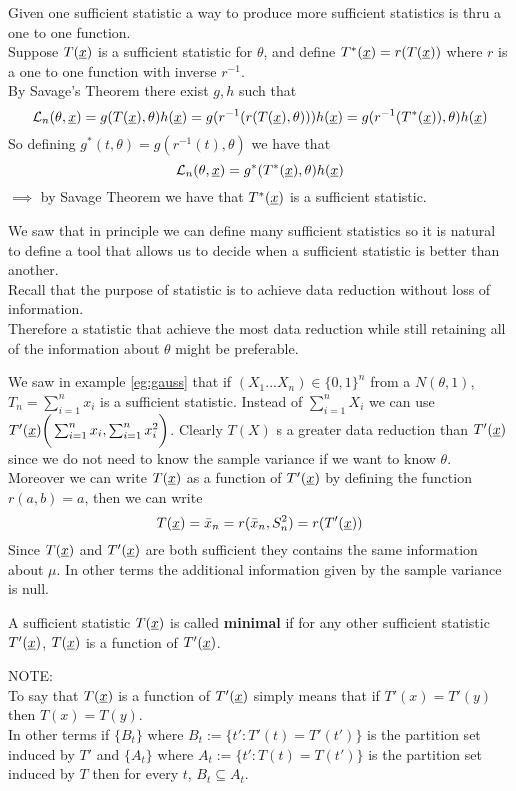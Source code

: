 \begin{oss}
 Given one sufficient statistic a way to produce more sufficient statistics is thru a one to one function.\\
Suppose $T(\underline x)$ is a sufficient statistic for $\theta$, and define $T^*(\underline x)=r(T(\underline x))$ where $r$ is a one to one function with inverse $r^{-1}$.\\
By Savage's Theorem there exist $g,h$ such that
$$\mathcal{L}_n(\theta,\underline x)=g(T(\underline x),\theta)h(\underline x)=g(r^{-1}(r(T(\underline x),\theta)))h(\underline x)=g(r^{-1}(T^*(\underline x)),\theta)h(\underline x)$$
So defining $g^*(t,\theta)=g(r^{-1}(t),\theta)$ we have that
$$\mathcal{L}_n(\theta,\underline x)=g^*(T^*(\underline x),\theta)h(\underline x)$$
$\implies$ by Savage Theorem we have that $T^*(\underline x)$ is a sufficient statistic.
\end{oss}
We saw that in principle we can define many sufficient statistics so it is natural to define a tool that allows us to decide when a sufficient statistic is better than another.\\
Recall that the purpose of statistic is to achieve data reduction without loss of information.\\
Therefore a statistic that achieve the most data reduction while still retaining all of the information about $\theta$ might be preferable.
\begin{oss}
	We saw in example \ref{eg:gauss} that if 	$(X_1... X_n)\in \{0,1\}^n$ from a $N(\theta,1)$,  $T_n=\sum_{i=1}^{n} x_i$ is a sufficient statistic. Instead of $\sum_{i=1}^{n} X_i$ we can use $T'(\underline x)\bigg( \sum_{i=1}^{n} x_i, \sum_{i=1}^{n} x_i^2 \bigg)$. Clearly $T(X)$ s a greater data reduction than $T'(\underline x)$ since we do not need to know the sample variance if we want to know $\theta$. Moreover we can write $T(\underline x)$ as a function of $T'(\underline x)$ by defining the function $r(a,b)=a$, then we can write
	$$T(\underline x)=\bar x_n=r(\bar x_n, S^2_n)=r(T'(\underline x))$$
	Since $T(\underline x)$ and $T'(\underline x)$ are both sufficient they contains the same information about $\mu$.
	In other terms the additional information given by the sample variance is null.
\end{oss} 
\begin{defi}
	A sufficient statistic $T(\underline x)$ is called \textbf{minimal} if for any other sufficient statistic $T'(\underline x)$, $T(\underline x)$ is a function of $T'(\underline x)$. 
\end{defi}
NOTE:\\
To say that $T(\underline x)$  is a function of  $T'(\underline x)$ simply means that if $T'(x)=T'(y)$ then $T(x)=T(y)$.\\
In other terms if $\{ B_t\} $ where $B_t:=\{t' : T'(t)=T'(t') \}$ is the partition set induced by $T'$ and $\{ A_t\} $ where $A_t:=\{t' : T(t)=T(t') \}$ is the partition set induced by $T$ then for every $t$, $B_t \subseteq A_t$.\\

